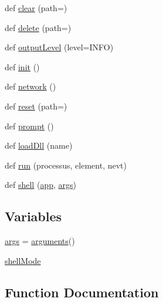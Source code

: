 \begin{DoxyCompactItemize}
\item 
def \hyperlink{namespaceshell_a14da1173b3cc5b8569cc0020130e3bd7}{clear} (path=\textquotesingle{}\textquotesingle{})
\item 
def \hyperlink{namespaceshell_a324876531afa651f59288dbab3f5603a}{delete} (path=\textquotesingle{}\textquotesingle{})
\item 
def \hyperlink{namespaceshell_ae17d022e61c0f8d61c3dee4f9bc68f51}{output\+Level} (level=\textquotesingle{}I\+N\+FO\textquotesingle{})
\item 
def \hyperlink{namespaceshell_aa0929fa150d13168df6061f9d51b727b}{init} ()
\item 
def \hyperlink{namespaceshell_ac644e906d4031b3ab30adb8e1984b252}{network} ()
\item 
def \hyperlink{namespaceshell_a2f31bbe4baf894f4863c4d392239ab8b}{reset} (path=\textquotesingle{}\textquotesingle{})
\item 
def \hyperlink{namespaceshell_af141a2fee68e5e84d8ac2cc51c3feedd}{prompt} ()
\item 
def \hyperlink{namespaceshell_a8bb3d636e52da2226367b0123101a49f}{load\+Dll} (name)
\item 
def \hyperlink{namespaceshell_ac89ea08a5e75ecb222fe9e707b3ee102}{run} (processus, element, nevt)
\item 
def \hyperlink{namespaceshell_a95156c76dce36cfad6d1e2fcb85265ed}{shell} (\hyperlink{namespaceshell_a79f68caaf52d03ff793360cebe45cc22}{app}, \hyperlink{namespaceshell_aa87f3fd6ea8190070b0b7326abebf39c}{args})
\end{DoxyCompactItemize}
\subsection*{Variables}
\begin{DoxyCompactItemize}
\item 
\hyperlink{namespaceshell_aa87f3fd6ea8190070b0b7326abebf39c}{args} = \hyperlink{classarguments_1_1arguments}{arguments}()
\item 
\hyperlink{namespaceshell_a01f54959c7299ff506841249f48b2d47}{shell\+Mode}
\end{DoxyCompactItemize}


\subsection{Function Documentation}
\mbox{\label{namespaceshell_a79f68caaf52d03ff793360cebe45cc22}} 
